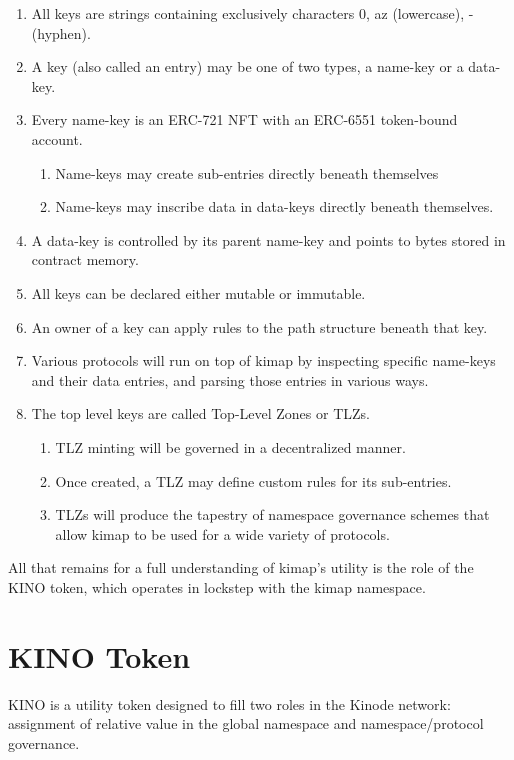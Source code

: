 \documentclass[runningheads]{llncs}
\begin{document}
\begin{enumerate}
    \item All keys are strings containing exclusively characters 0, a\textendash z (lowercase), - (hyphen).
    \item A key (also called an entry) may be one of two types, a name-key or a data-key.
    \item Every name-key is an ERC-721 NFT with an ERC-6551 token-bound account.
        \begin{enumerate}
            \item Name-keys may create sub-entries directly beneath themselves
            \item Name-keys may inscribe data in data-keys directly beneath themselves.
        \end{enumerate}
    \item A data-key is controlled by its parent name-key and points to bytes stored in contract memory.
    \item All keys can be declared either mutable or immutable.
    \item An owner of a key can apply rules to the path structure beneath that key.
    \item Various protocols will run on top of kimap by inspecting specific name-keys and their data entries, and parsing those entries in various ways.
    \item The top level keys are called Top-Level Zones or TLZs.
        \begin{enumerate}
            \item TLZ minting will be governed in a decentralized manner.
            \item Once created, a TLZ may define custom rules for its sub-entries.
            \item TLZs will produce the tapestry of namespace governance schemes that allow kimap to be used for a wide variety of protocols.
        \end{enumerate}
\end{enumerate}

All that remains for a full understanding of kimap's utility is the role of the KINO token, which operates in lockstep with the kimap namespace.

\section{KINO Token}
\label{sec:kino}

KINO is a utility token designed to fill two roles in the Kinode network: assignment of relative value in the global namespace and namespace/protocol governance.
\end{document}
